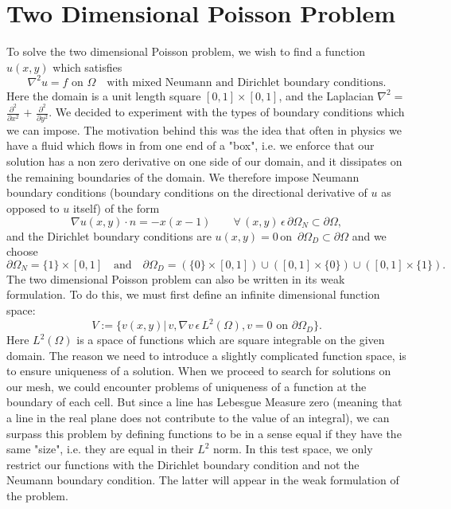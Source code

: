 \documentclass{article}
\begin{document}
\section{Two Dimensional Poisson Problem}
To solve the two dimensional Poisson problem, we wish to find a function $u(x,y)$ which satisfies 
\[\nabla^{2}u = f\,\,\textrm{on }\Omega \quad \textrm{with mixed Neumann and Dirichlet boundary conditions}.\]
Here the domain is a unit length square $[0,1]\times[0,1]$, and the Laplacian $\nabla^{2} =$ {\large$\frac{\partial^2}{\partial x^2}$} $+$ {\large$\frac{\partial^2}{\partial y^2}$}. We decided to experiment with the types of boundary conditions which we can impose. The motivation behind this was the idea that often in physics we have a fluid which flows in from one end of a "box", i.e. we enforce that our solution has a non zero derivative on one side of our domain, and it dissipates on the remaining boundaries of the domain. We therefore impose Neumann boundary conditions (boundary conditions on the directional derivative of $u$ as opposed to $u$ itself)  of the form $$\nabla u(x,y)\cdot \hat{n} = -x(x-1) \qquad \forall\, (x,y)\, \epsilon \,\partial\Omega_N \subset \partial\Omega,$$
and the Dirichlet boundary conditions are $u(x,y) = 0 \, \textrm{on } \,\partial\Omega_D\subset\partial\Omega$
 and we choose $$\partial\Omega_N = \{1\}\times [0,1] \quad \textrm{and} \quad \partial\Omega_D = (\{0\}\times [0,1]) \cup ([0,1]\times\{0\})\cup ([0,1]\times\{1\}). $$
The two dimensional Poisson problem can also be written in its weak formulation. To do this, we must first define an infinite dimensional function space:
$$V := \{v(x,y)| \,v, \nabla v \,\epsilon\, L^2(\Omega),  v = 0 \,\, \textrm{on } \partial\Omega_D\}.$$
Here $L^2(\Omega)$ is a space of functions which are square integrable on the given domain. The reason we need to introduce a slightly complicated function space, is to ensure uniqueness of a solution. When we proceed to search for solutions on our mesh, we could encounter problems of uniqueness of a function at the boundary of each cell. But since a line has Lebesgue Measure zero (meaning that a line in the real plane does not contribute to the value of an integral), we can surpass this problem by defining functions to be in a sense equal if they have the same "size", i.e. they are equal in their $L^2$ norm. In this test space, we only restrict our functions with the Dirichlet boundary condition and not the Neumann boundary condition. The latter will appear in the weak formulation of the problem. 
\end{document}
